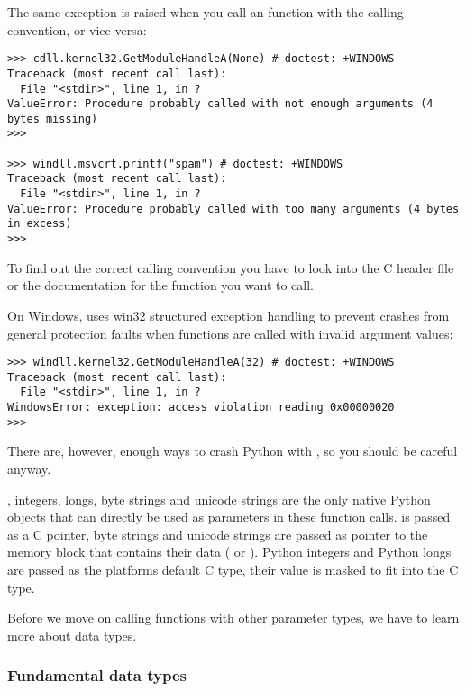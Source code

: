 The same exception is raised when you call an  function
with the  calling convention, or vice versa:
\begin{verbatim}
>>> cdll.kernel32.GetModuleHandleA(None) # doctest: +WINDOWS
Traceback (most recent call last):
  File "<stdin>", line 1, in ?
ValueError: Procedure probably called with not enough arguments (4 bytes missing)
>>>

>>> windll.msvcrt.printf("spam") # doctest: +WINDOWS
Traceback (most recent call last):
  File "<stdin>", line 1, in ?
ValueError: Procedure probably called with too many arguments (4 bytes in excess)
>>>
\end{verbatim}

To find out the correct calling convention you have to look into the C
header file or the documentation for the function you want to call.

On Windows,  uses win32 structured exception handling to
prevent crashes from general protection faults when functions are
called with invalid argument values:
\begin{verbatim}
>>> windll.kernel32.GetModuleHandleA(32) # doctest: +WINDOWS
Traceback (most recent call last):
  File "<stdin>", line 1, in ?
WindowsError: exception: access violation reading 0x00000020
>>>
\end{verbatim}

There are, however, enough ways to crash Python with , so
you should be careful anyway.

, integers, longs, byte strings and unicode strings are the
only native Python objects that can directly be used as parameters in
these function calls.   is passed as a C  pointer,
byte strings and unicode strings are passed as pointer to the memory
block that contains their data ( or ).  Python
integers and Python longs are passed as the platforms default C
 type, their value is masked to fit into the C type.

Before we move on calling functions with other parameter types, we
have to learn more about  data types.


\subsubsection{Fundamental data types\label{ctypes-fundamental-data-types}}

